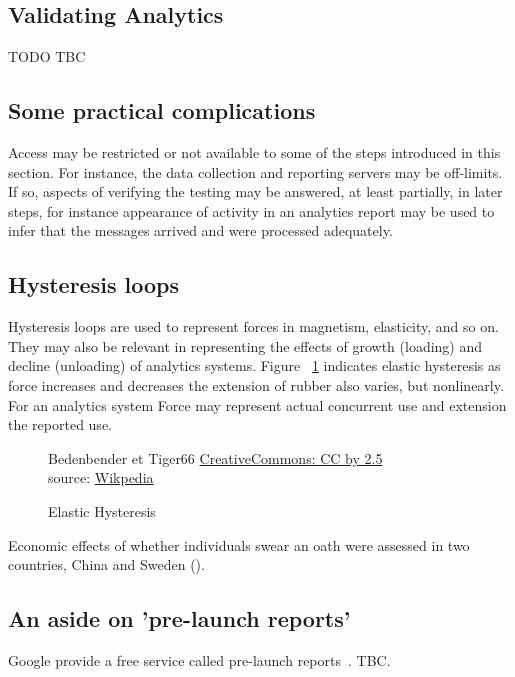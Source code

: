 \subsection{Validating Analytics}

TODO TBC

\subsection{Some practical complications} 
Access may be restricted or not available to some of the steps introduced in this section. For instance, the data collection and reporting servers may be off-limits. If so, aspects of verifying the testing may be answered, at least partially, in later steps, for instance appearance of activity in an analytics report may be used to infer that the messages arrived and were processed adequately.

\subsection{Hysteresis loops}

Hysteresis loops are used to represent forces in magnetism, elasticity, and so on. They may also be relevant in representing the effects of growth (loading) and decline (unloading) of analytics systems. Figure ~\ref{fig:elastic-hysteresis} indicates elastic hysteresis as force increases and decreases the extension of rubber also varies, but nonlinearly. For an analytics system Force may represent actual concurrent use and extension the reported use.

\begin{figure}[!htbp]
    \centering
    \copyrightbox[r]{
        }
    {\textcopyright Bedenbender et Tiger66 \href{{https://creativecommons.org/licenses/by/2.5}}{CreativeCommons: CC by 2.5}\\source: \href{https://commons.wikimedia.org/wiki/File:Elastic_Hysteresis.svg}{Wikpedia}}
    \caption{Elastic Hysteresis}
    \label{fig:elastic-hysteresis}
\end{figure}

Economic effects of whether individuals swear an oath were assessed in two countries, China and Sweden (\cite{carlsson2013truth}). %


\subsection{An aside on 'pre-launch reports'}
Google provide a free service called pre-launch reports~\cite{google_use_pre_launch_reports}. TBC.

